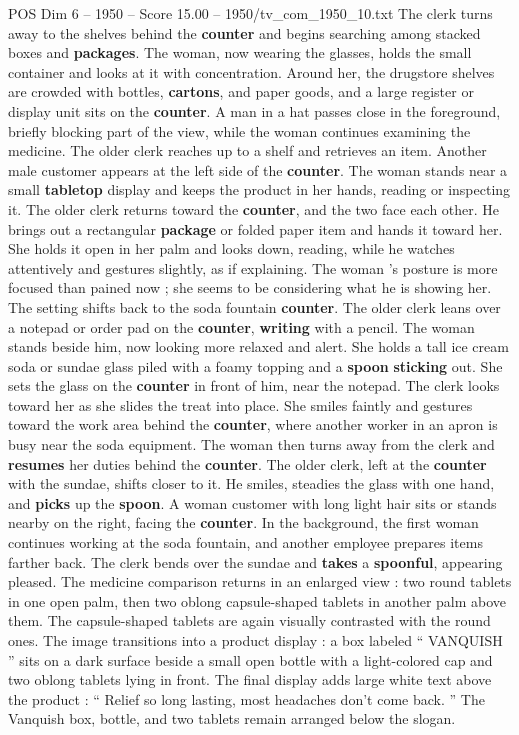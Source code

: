\begin{textsample}{POS Dim 6 – 1950 – Score 15.00 – 1950/tv\_com\_1950\_10.txt}
The clerk turns away to the shelves behind the \textbf{counter} and begins searching among stacked boxes and \textbf{packages}.
The woman, now wearing the glasses, holds the small container and looks at it with concentration.
Around her, the drugstore shelves are crowded with bottles, \textbf{cartons}, and paper goods, and a large register or display unit sits on the \textbf{counter}.
A man in a hat passes close in the foreground, briefly blocking part of the view, while the woman continues examining the medicine.
The older clerk reaches up to a shelf and retrieves an item.
Another male customer appears at the left side of the \textbf{counter}.
The woman stands near a small \textbf{tabletop} display and keeps the product in her hands, reading or inspecting it.
The older clerk returns toward the \textbf{counter}, and the two face each other.
He brings out a rectangular \textbf{package} or folded paper item and hands it toward her.
She holds it open in her palm and looks down, reading, while he watches attentively and gestures slightly, as if explaining.
The woman ’s posture is more focused than pained now ; she seems to be considering what he is showing her.
The setting shifts back to the soda fountain \textbf{counter}.
The older clerk leans over a notepad or order pad on the \textbf{counter}, \textbf{writing} with a pencil.
The woman stands beside him, now looking more relaxed and alert.
She holds a tall ice cream soda or sundae glass piled with a foamy topping and a \textbf{spoon} \textbf{sticking} out.
She sets the glass on the \textbf{counter} in front of him, near the notepad.
The clerk looks toward her as she slides the treat into place.
She smiles faintly and gestures toward the work area behind the \textbf{counter}, where another worker in an apron is busy near the soda equipment.
The woman then turns away from the clerk and \textbf{resumes} her duties behind the \textbf{counter}.
The older clerk, left at the \textbf{counter} with the sundae, shifts closer to it.
He smiles, steadies the glass with one hand, and \textbf{picks} up the \textbf{spoon}.
A woman customer with long light hair sits or stands nearby on the right, facing the \textbf{counter}.
In the background, the first woman continues working at the soda fountain, and another employee prepares items farther back.
The clerk bends over the sundae and \textbf{takes} a \textbf{spoonful}, appearing pleased.
The medicine comparison returns in an enlarged view : two round tablets in one open palm, then two oblong capsule-shaped tablets in another palm above them.
The capsule-shaped tablets are again visually contrasted with the round ones.
The image transitions into a product display : a box labeled “ VANQUISH ” sits on a dark surface beside a small open bottle with a light-colored cap and two oblong tablets lying in front.
The final display adds large white text above the product : “ Relief so long lasting, most headaches don't come back. ” The Vanquish box, bottle, and two tablets remain arranged below the slogan.

\end{textsample}
